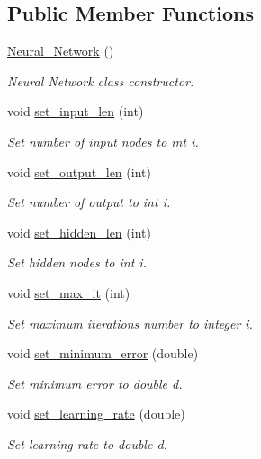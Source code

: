 \subsection*{Public Member Functions}
\begin{DoxyCompactItemize}
\item 
\hyperlink{a00003_a6f3defa930afbcb64a305393f741a2a4}{Neural\-\_\-\-Network} ()
\begin{DoxyCompactList}\small\item\em Neural Network class constructor. \end{DoxyCompactList}\item 
void \hyperlink{a00003_afb37f8321b35bbc9b9beb88d56d69f08}{set\-\_\-input\-\_\-len} (int)
\begin{DoxyCompactList}\small\item\em Set number of input nodes to int i. \end{DoxyCompactList}\item 
void \hyperlink{a00003_a695079279950a3eb27d62df68d32927c}{set\-\_\-output\-\_\-len} (int)
\begin{DoxyCompactList}\small\item\em Set number of output to int i. \end{DoxyCompactList}\item 
void \hyperlink{a00003_ad1e1afff306e47947e23f4fdd4517e22}{set\-\_\-hidden\-\_\-len} (int)
\begin{DoxyCompactList}\small\item\em Set hidden nodes to int i. \end{DoxyCompactList}\item 
void \hyperlink{a00003_acc883578064786f6c093346424fac1e9}{set\-\_\-max\-\_\-it} (int)
\begin{DoxyCompactList}\small\item\em Set maximum iterations number to integer i. \end{DoxyCompactList}\item 
void \hyperlink{a00003_a0458bfedabe1b42e4d30e3179bd1f189}{set\-\_\-minimum\-\_\-error} (double)
\begin{DoxyCompactList}\small\item\em Set minimum error to double d. \end{DoxyCompactList}\item 
void \hyperlink{a00003_a87a3c876501fcd89ffc1caf298fa2703}{set\-\_\-learning\-\_\-rate} (double)
\begin{DoxyCompactList}\small\item\em Set learning rate to double d. \end{DoxyCompactList}\item 

\end{DoxyCompactItemize}
